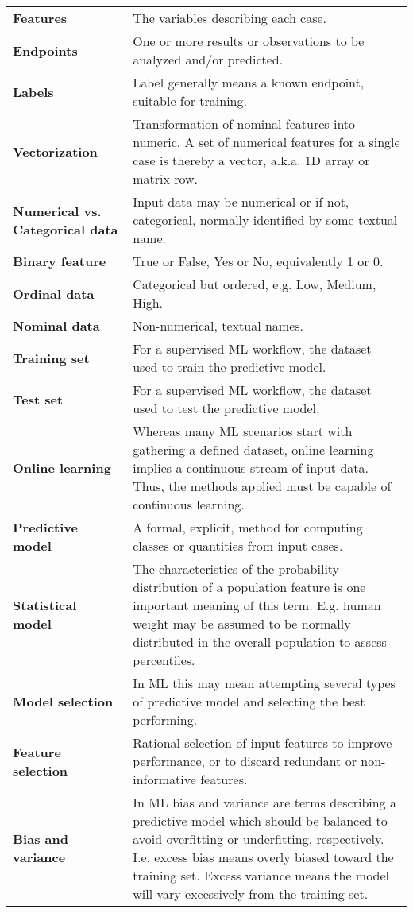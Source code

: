 \begin{appendices}
\begin{longtable}{p{0.3\linewidth}p{0.7\linewidth}}
\textbf{Features} & The variables describing each case. \\
\textbf{Endpoints} & One or more results or observations to be analyzed and/or predicted. \\
\textbf{Labels} & Label generally means a known endpoint, suitable for training. \\
\textbf{Vectorization} & Transformation of nominal features into numeric.  A set of numerical features for a single case is thereby a vector, a.k.a. 1D array or matrix row. \\
\textbf{Numerical vs. Categorical data} & Input data may be numerical or if not, categorical, normally identified by some textual name. \\
\textbf{Binary feature} & True or False, Yes or No, equivalently 1 or 0. \\
\textbf{Ordinal data} & Categorical but ordered, e.g. Low, Medium, High. \\
\textbf{Nominal data} & Non-numerical, textual names. \\
\textbf{Training set} & For a supervised ML workflow, the dataset used to train the predictive model. \\
\textbf{Test set} & For a supervised ML workflow, the dataset used to test the predictive model. \\
\textbf{Online learning} & Whereas many ML scenarios start with gathering a defined dataset, online learning implies a continuous stream of input data.  Thus, the methods applied must be capable of continuous learning. \\
\textbf{Predictive model} & A formal, explicit, method for computing classes or quantities from input cases. \\
\textbf{Statistical model} & The characteristics of the probability distribution of a population feature is one important meaning of this term.  E.g. human weight may be assumed to be normally distributed in the overall population to assess percentiles. \\
\textbf{Model selection} & In ML this may mean attempting several types of predictive model and selecting the best performing. \\
\textbf{Feature selection} & Rational selection of input features to improve performance, or to discard redundant or non-informative features. \\
\textbf{Bias and variance} & In ML bias and variance are terms describing a predictive model which should be balanced to avoid overfitting or underfitting, respectively.  I.e. excess bias means overly biased toward the training set.  Excess variance means the model will vary excessively from the training set. \\

\end{longtable}
\end{appendices}
